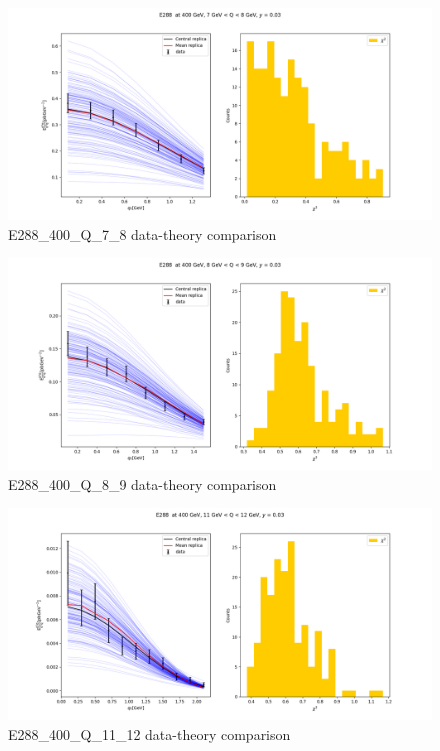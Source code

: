 \documentclass[
]{article}
\begin{document}
\begin{figure}
\centering
\includegraphics{pngplots/E288_400_Q_7_8.png}
\caption{E288\_400\_Q\_7\_8 data-theory comparison}
\end{figure}

\begin{figure}
\centering
\includegraphics{pngplots/E288_400_Q_8_9.png}
\caption{E288\_400\_Q\_8\_9 data-theory comparison}
\end{figure}

\begin{figure}
\centering
\includegraphics{pngplots/E288_400_Q_11_12.png}
\caption{E288\_400\_Q\_11\_12 data-theory comparison}
\end{figure}
\end{document}

